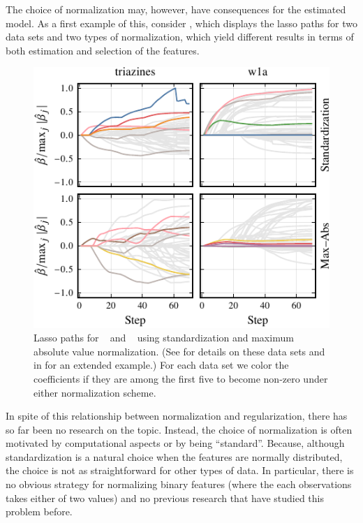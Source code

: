 The choice of normalization may, however, have consequences for the estimated model. As a
first example of this, consider , which displays the lasso paths
for two data sets and two types of normalization, which yield different results in terms of
both estimation and selection of the features.

\begin{figure}[bpt]
  \centering
  \includegraphics[]{plots/realdata_paths_small.pdf}
  \caption{%
    Lasso paths for ~\citep{king} and
    ~\citep{platt1998} using standardization and maximum absolute
    value normalization. (See  for details
    on these data sets and  in
     for an extended example.) For each data
    set we color the coefficients if they are among the first five to become
    non-zero under either normalization scheme.
  }
  \label{fig:realdata-paths}
\end{figure}

In spite of this relationship between normalization and regularization, there has so far
been no research on the topic. Instead, the choice of normalization is often motivated by
computational aspects or by being ``standard''. Because, although standardization is a
natural choice when the features are normally distributed, the choice is not as
straightforward for other types of data. In particular, there is no obvious strategy for
normalizing binary features (where the each observations takes either of two values) and no
previous research that have studied this problem before.


